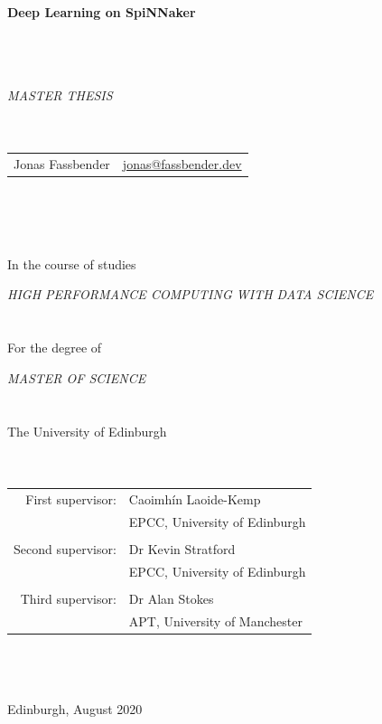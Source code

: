 \documentclass[]{article}
\def\title{Deep Learning on SpiNNaker}
\begin{document}
\begin{titlepage}
\begin{center}
\begin{Huge}
\textbf{\title}
\end{Huge}
~\\
~\\
~\\
\textit{\Large {\LARGE M}ASTER {\LARGE T}HESIS}
~\\
~\\
~\\
\begin{Large}
\begin{tabu} to \textwidth {Xr}
Jonas Fassbender
&\href{mailto:jonas@fassbender.dev}{jonas@fassbender.dev}
\end{tabu}
\end{Large}
~\\
~\\
~\\
\begin{large}
In the course of studies

\textit{{\Large H}IGH {\Large P}ERFORMANCE {\Large C}OMPUTING WITH {\Large D}ATA {\Large S}CIENCE}
~\\
~\\
~\\
For the degree of

\textit{{\Large M}ASTER OF {\Large S}CIENCE}
~\\
~\\
~\\
The University of Edinburgh
~\\
~\\
~\\
\begin{tabular}{rl}
  First supervisor: &Caoimhín Laoide-Kemp \\
                    &EPCC, University of Edinburgh \\
  &\\
  Second supervisor: &Dr Kevin Stratford \\
                     &EPCC, University of Edinburgh \\
  &\\
  Third supervisor: &Dr Alan Stokes \\
                    &APT, University of Manchester \\
\end{tabular}
~\\
~\\
~\\
Edinburgh, August 2020
\end{large}
\end{center}
\end{titlepage}
\end{document}
